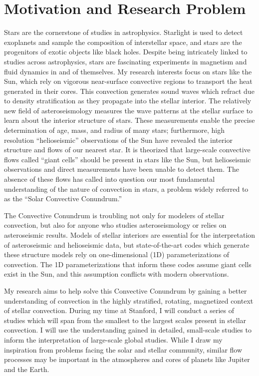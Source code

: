 \documentclass[aps, pre, onecolumn, nofootinbib, notitlepage, groupedaddress, amsfonts, amssymb, amsmath]{revtex4-1}
\begin{document}
\section*{Motivation and Research Problem}
\vspace{-11pt}
Stars are the cornerstone of studies in astrophysics.
Starlight is used to detect exoplanets and sample the composition of interstellar space, and stars are the progenitors of exotic objects like black holes.
Despite being intricately linked to studies across astrophysics, stars are fascinating experiments in magnetism and fluid dynamics in and of themselves.
My research interests focus on stars like the Sun, which rely on vigorous near-surface convective regions to transport the heat generated in their cores.
This convection generates sound waves which refract due to density stratification as they propagate into the stellar interior.
The relatively new field of asteroseismology measures the wave patterns at the stellar surface to learn about the interior structure of stars.
These measurements enable the precise determination of age, mass, and radius of many stars; furthermore, high resolution ``helioseismic'' observations of the Sun have revealed the interior structure and flows of our nearest star.
It is theorized that large-scale convective flows called ``giant cells'' should be present in stars like the Sun, but helioseismic observations and direct measurements have been unable to detect them.
The absence of these flows has called into question our most fundamental understanding of the nature of convection in stars, a problem widely referred to as the ``Solar Convective Conundrum.''

The Convective Conundrum is troubling not only for modelers of stellar convection, but also for anyone who studies asteroseismology or relies on asteroseismic results.
Models of stellar interiors are essential for the interpretation of asteroseismic and helioseismic data, but state-of-the-art codes which generate these structure models rely on one-dimensional (1D) parameterizations of convection.
The 1D parameterizations that inform these codes assume giant cells exist in the Sun, and this assumption conflicts with modern observations.

My research aims to  help solve this Convective Conundrum by gaining a better understanding of convection in the highly stratified, rotating, magnetized context of stellar convection.
During my time at Stanford, I will conduct a series of studies which will span from the smallest to the largest scales present in stellar convection.
I will use the understanding gained in detailed, small-scale studies to inform the interpretation of large-scale global studies.
While I draw my inspiration from problems facing the solar and stellar community, similar flow processes may be important in the atmospheres and cores of planets like Jupiter and the Earth. 
\end{document}
